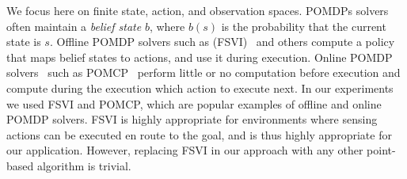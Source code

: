 \documentclass[letterpaper]{article} %
\begin{document}
We focus here on finite state, action, and observation spaces. %
POMDPs solvers often maintain a \emph{belief state} $b$, where $b(s)$ is the probability that the current state is $s$.
Offline POMDP solvers such as (FSVI)~\cite{shani2007forward} and others \cite{pineau2003point,spaan2005perseus,smith2012point} compute a policy that maps belief states to actions, and use it during execution.
Online POMDP solvers~\cite{washington1997bi,silver2010monte,somani2013despot} such as POMCP~\cite{silver2010monte} perform little or no computation before execution and compute during the execution which action to execute next.
In our experiments we used FSVI and POMCP, which are popular examples of offline and online POMDP solvers. FSVI is highly appropriate for environments where sensing actions can be executed en route to the goal, and is thus highly appropriate for our application. However, replacing FSVI in our approach with any other point-based algorithm is trivial.
\end{document}
